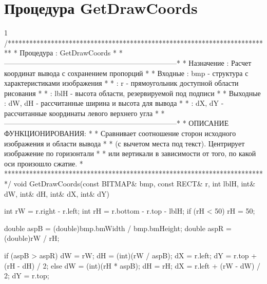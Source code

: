 \section{Процедура GetDrawCoords}
\footnotesize
\begin{listing}{1}
/*************************************************************************
* Процедура      : GetDrawCoords                                         *
*------------------------------------------------------------------------*
* Назначение     : Расчет координат вывода с сохранением пропорций       *
* Входные        : bmp  - структура с характеристиками изображения       *
*                : r    - прямоугольник доступной области рисования      *
*                : lblH - высота области, резервируемой под подписи      *
* Выходные       : dW, dH - рассчитанные ширина и высота для вывода     *
*                : dX, dY - рассчитанные координаты левого верхнего угла *
*------------------------------------------------------------------------*
* ОПИСАНИЕ ФУНКЦИОНИРОВАНИЯ:                                             *
* Сравнивает соотношение сторон исходного изображения и области вывода  *
* (с вычетом места под текст). Центрирует изображение по горизонтали     *
* или вертикали в зависимости от того, по какой оси произошло сжатие.   *
*************************************************************************/
void GetDrawCoords(const BITMAP& bmp, const RECT& r, int lblH,
                   int& dW, int& dH, int& dX, int& dY) {
    int rW = r.right - r.left;
    int rH = r.bottom - r.top - lblH;
    if (rH < 50) rH = 50;
    
    double aspB = (double)bmp.bmWidth / bmp.bmHeight;
    double aspR = (double)rW / rH;
    
    if (aspB > aspR) {
        dW = rW;
        dH = (int)(rW / aspB);
        dX = r.left;
        dY = r.top + (rH - dH) / 2;
    } else {
        dW = (int)(rH * aspB);
        dH = rH;
        dX = r.left + (rW - dW) / 2;
        dY = r.top;
    }
}
\end{listing}
\normalsize

\pagebreak

